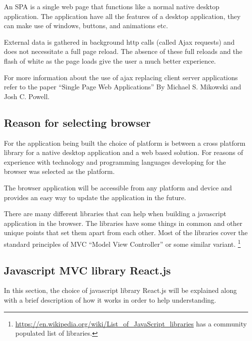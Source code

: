 An SPA is a single web page that functions like a normal native desktop
application. The application have all the features of a desktop application,
they can make use of windows, buttons, and animations etc.

External data is gathered in background http calls (called Ajax
requests) and does not necessitate a full page reload. The absence of
these full reloads and the flash of white as the page loads give the
user a much better experience.

For more information about the use of ajax replacing client server applications
refer to the paper ``Single Page Web Applications'' By Michael S. Mikowski and Josh C.
Powell\cite{garrett2005ajax}.

\subsection{Reason for selecting browser}\label{reason-for-selecting-browser}

For the application being built the choice of platform is between a
cross platform library for a native desktop application and a web based
solution. For reasons of experience with technology and programming
languages developing for the browser was selected as the platform.

The browser application will be accessible from any platform and device
and provides an easy way to update the application in the future.

There are many different libraries that can help when building a javascript
application in the browser. The libraries have some things in common and other
unique points that set them apart from each other. Most of the libraries cover
the standard principles of MVC ``Model View Controller'' or some similar
variant. \footnote{
\href{https://en.wikipedia.org/wiki/List_of_JavaScript_libraries\#Web-application_related_.28MVC.2C_MVVM.29}%
{https://en.wikipedia.org/wiki/List\_of\_JavaScript\_libraries}
has a community populated list of libraries.}

\subsection{Javascript MVC library React.js}\label{javascript-mvc-library-react.js}

In this section, the choice of javascript library React.js will be explained
along with a brief description of how it works in order to help understanding.

